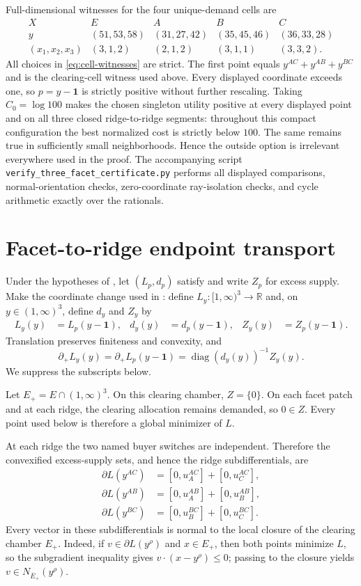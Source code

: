 \documentclass[11pt,a4paper,fleqn]{article}
\theoremstyle{plain}
\theoremstyle{definition}
\newcommand{\R}{\mathbb{R}}
\newcommand{\diag}{\operatorname{diag}}
\newcommand{\one}{\mathbf{1}}
\begin{document}
Full-dimensional witnesses for the four unique-demand cells are
\begin{equation}\label{eq:cell-witnesses}
\begin{array}{c|cccc}
X&E&A&B&C\\ \hline
y&(51,53,58)&(31,27,42)&(35,45,46)&(36,33,28)\\
(x_1,x_2,x_3)&(3,1,2)&(2,1,2)&(3,1,1)&(3,3,2).
\end{array}
\end{equation}
All choices in \eqref{eq:cell-witnesses} are strict. The first point equals $y^{AC}+y^{AB}+y^{BC}$ and is the clearing-cell witness used above. Every displayed coordinate exceeds one, so $p=y-\one$ is strictly positive without further rescaling. Taking $C_0=\log 100$ makes the chosen singleton utility positive at every displayed point and on all three closed ridge-to-ridge segments: throughout this compact configuration the best normalized cost is strictly below $100$. The same remains true in sufficiently small neighborhoods. Hence the outside option is irrelevant everywhere used in the proof. The accompanying script \texttt{verify\_three\_facet\_\allowbreak certificate.py} performs all displayed comparisons, normal-orientation checks, zero-coordinate ray-isolation checks, and cycle arithmetic exactly over the rationals.

\section{Facet-to-ridge endpoint transport}\label{app:cell-gradient}

Under the hypotheses of , let $(L_p,d_p)$ satisfy  and write $Z_p$ for excess supply. Make the coordinate change used in : define $L_y:[1,\infty)^3\to\R$ and, on $y\in(1,\infty)^3$, define $d_y$ and $Z_y$ by
\begin{align*}
L_y(y)&=L_p(y-\one),
&d_y(y)&=d_p(y-\one),
&Z_y(y)&=Z_p(y-\one).
\end{align*}
Translation preserves finiteness and convexity, and
\[
\partial_+ L_y(y)=\partial_+ L_p(y-\one)
=\diag(d_y(y))^{-1}Z_y(y).
\]
We suppress the subscripts below.

Let $E_+=E\cap(1,\infty)^3$. On this clearing chamber, $Z=\{0\}$. On each facet patch and at each ridge, the clearing allocation remains demanded, so $0\in Z$. Every point used below is therefore a global minimizer of $L$.

At each ridge the two named buyer switches are independent. Therefore the convexified excess-supply sets, and hence the ridge subdifferentials, are
\begin{align*}
\partial L(y^{AC})&=[0,u_A^{AC}]+[0,u_C^{AC}],\\
\partial L(y^{AB})&=[0,u_A^{AB}]+[0,u_B^{AB}],\\
\partial L(y^{BC})&=[0,u_B^{BC}]+[0,u_C^{BC}].
\end{align*}
Every vector in these subdifferentials is normal to the local closure of the clearing chamber $E_+$. Indeed, if $v\in\partial L(y^\rho)$ and $x\in E_+$, then both points minimize $L$, so the subgradient inequality gives $v\cdot(x-y^\rho)\le0$; passing to the closure yields $v\in N_{\overline E_+}(y^\rho)$.
\end{document}
